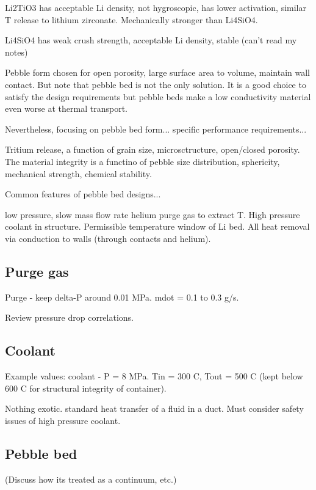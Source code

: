 \documentclass[11pt]{report} %
\begin{document}
Li2TiO3 has acceptable Li density, not hygroscopic, has lower activation, similar T release to lithium zirconate. Mechanically stronger than Li4SiO4.

Li4SiO4 has weak crush strength, acceptable Li density, stable (can't read my notes)


Pebble form chosen for open porosity, large surface area to volume, maintain wall contact. But note that pebble bed is not the only solution. It is a good choice to satisfy the design requirements but pebble beds make a low conductivity material even worse at thermal transport.

Nevertheless, focusing on pebble bed form... specific performance requirements...

Tritium release, a function of grain size, microsctructure, open/closed porosity. The material integrity is a functino of pebble size distribution, sphericity, mechanical strength, chemical stability.


Common features of pebble bed designs...

low pressure, slow mass flow rate helium purge gas to extract T. High pressure coolant in structure. Permissible temperature window of Li bed. All heat removal via conduction to walls (through contacts and helium).

\subsection{Purge gas}
Purge - keep delta-P around 0.01 MPa. mdot = 0.1 to 0.3 g/s.

Review pressure drop correlations.

\subsection{Coolant}

Example values: coolant - P = 8 MPa. Tin = 300 C, Tout = 500 C (kept below 600 C for structural integrity of container).

Nothing exotic. standard heat transfer of a fluid in a duct. Must consider safety issues of high pressure coolant.

\subsection{Pebble bed}
(Discuss how its treated as a continuum, etc.)
\end{document}
